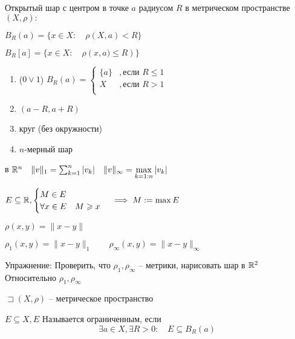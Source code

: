     \begin{definition}
        Открытый шар с центром в точке $a$ радиусом $R$ в метрическом пространстве $\left( X,\rho \right) :$

        $B_R(a) = \{x\in X:\quad\rho(X,a)<R\}$

        $B_R[a] = \{x\in X:\quad \rho\left(x, a)\leqslant R  \right) \}$
    \end{definition}
    \begin{example}
        \begin{enumerate}
            \item ($0 \vee 1$) $B_R(a) = \begin{cases}
                    \{a\} &, \text{если } R\leqslant 1\\
                    X&, \text{если } R>1\\
            \end{cases}$
        \item $(a-R,a+R)$
        \item круг (без окружности)
        \item $n$-мерный шар
        \end{enumerate}

        в $\mathbb{R}^n\quad \|v\|_1 = \sum_{k=1}^{n} |v_k|\quad \|v\|_{\infty } = \max\limits_{k=1:n} |v_k|$
    \end{example}
    \begin{definition}
        $E\subseteq \mathbb{R}, \begin{cases}
            M\in E\\
            \forall x\in E\quad 
            M\geqslant x\\
        \end{cases} \implies M:= \max E $
    \end{definition}

    $\rho(x,y) = \|x-y\|$

    $\rho_1(x,y) = \|x-y\|_1\qquad \rho_{\infty }(x,y) = \|x-y\|_{\infty }$

    Упражнение: Проверить, что $\rho_1, \rho_{\infty }$ -- метрики, нарисовать шар в $\mathbb{R}^2$ Относительно $\rho_1, \rho_{\infty }$

    \begin{definition}
        $\sqsupset (X, \rho)$ -- метрическое пространство

        $E \subseteq X, E $ Называется ограниченным, если  $$\exists a\in X, \exists R>0:\quad E\subseteq B_R(a) $$
    \end{definition}

